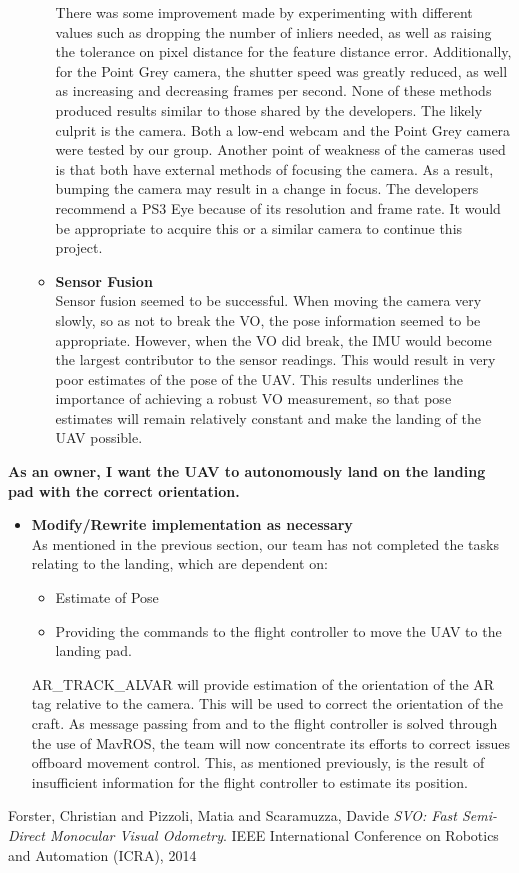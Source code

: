 \begin{itemize}
\begin{itemize}
There was some improvement made by experimenting with different values such as dropping the number of inliers needed, as well as raising the tolerance on pixel distance for the feature distance error. Additionally, for the Point Grey camera, the shutter speed was greatly reduced, as well as increasing and decreasing frames per second. None of these methods produced results similar to those shared by the developers. The likely culprit is the camera. Both a low-end webcam and the Point Grey camera were tested by our group. Another point of weakness of the cameras used is that both have external methods of focusing the camera. As a result, bumping the camera may result in a change in focus. The developers recommend a PS3 Eye because of its resolution and frame rate. It would be appropriate to acquire this or a similar camera to continue this project.
\item \textbf{Sensor Fusion}\\
Sensor fusion seemed to be successful. When moving the camera very slowly, so as not to break the VO, the pose information seemed to be appropriate. However, when the VO did break, the IMU would become the largest contributor to the sensor readings. This would result in very poor estimates of the pose of the UAV. This results underlines the importance of achieving a robust VO measurement, so that pose estimates will remain relatively constant and make the landing of the UAV possible.
\end{itemize}

\end{itemize}



\vspace{3mm}
\noindent \large{\textbf{As an owner, I want the UAV to autonomously land on the landing pad with the correct orientation.}}
\normalsize
\begin{itemize}
\item \textbf{Modify/Rewrite implementation as necessary}\\
As mentioned in the previous section, our team has not completed the tasks relating to the landing, which are dependent on:
\begin{itemize}
\item Estimate of Pose
\item Providing the commands to the flight controller to move the UAV to the landing pad.
\end{itemize}
AR\_TRACK\_ALVAR will provide estimation of the orientation of the AR tag relative to the camera. This will be used to correct the orientation of the craft. As message passing from and to the flight controller is solved through the use of MavROS, the team will now concentrate its efforts to correct issues offboard movement control. This, as mentioned previously, is the result of insufficient information for the flight controller to estimate its position.
\end{itemize}


\begin{thebibliography}{9}
Forster, Christian and Pizzoli, Matia and Scaramuzza, Davide
\textit{SVO: Fast Semi-Direct Monocular Visual Odometry}. 
IEEE International Conference on Robotics and Automation (ICRA), 2014
\end{thebibliography}
 